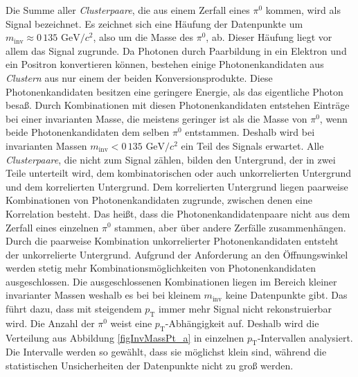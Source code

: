 Die Summe aller \textit{Clusterpaare}, die aus einem Zerfall eines $\pi^{0}$ kommen, wird als Signal bezeichnet.
Es zeichnet sich eine Häufung der Datenpunkte um $m_{\text{inv}}\approx 0\,135\text{ GeV}/c^{2}$, also um die Masse des $\pi^{0}$, ab.
Dieser Häufung liegt vor allem das Signal zugrunde.
Da Photonen durch Paarbildung in ein Elektron und ein Positron konvertieren können, bestehen einige Photonenkandidaten aus \textit{Clustern} aus nur einem der beiden Konversionsprodukte.
Diese Photonenkandidaten besitzen eine geringere Energie, als das eigentliche Photon besaß.
Durch Kombinationen mit diesen Photonenkandidaten entstehen Einträge bei einer invarianten Masse, die meistens geringer ist als die Masse von $\pi^{0}$, wenn beide Photonenkandidaten dem selben $\pi^{0}$ entstammen.
Deshalb wird bei invarianten Massen $m_\text{inv}<0\,135\text{ GeV}/c^{2}$ ein Teil des Signals erwartet.
\newline
Alle \textit{Clusterpaare}, die nicht zum Signal zählen, bilden den Untergrund, der in zwei Teile unterteilt wird, dem kombinatorischen oder auch unkorrelierten Untergrund und dem korrelierten Untergrund.
Dem korrelierten Untergrund liegen paarweise Kombinationen von Photonenkandidaten zugrunde, zwischen denen eine Korrelation besteht.
Das heißt, dass die Photonenkandidatenpaare nicht aus dem Zerfall eines einzelnen $\pi^{0}$ stammen, aber über andere Zerfälle zusammenhängen.
Durch die paarweise Kombination unkorrelierter Photonenkandidaten entsteht der unkorrelierte Untergrund.
\newline
Aufgrund der Anforderung an den Öffnungswinkel werden stetig mehr Kombinationsmöglichkeiten von Photonenkandidaten ausgeschlossen.
Die ausgeschlossenen Kombinationen liegen im Bereich kleiner invarianter Massen weshalb es bei bei kleinem $m_{\text{inv}}$ keine Datenpunkte gibt.
Das führt dazu, dass mit steigendem $p_{\text{T}}$ immer mehr Signal nicht rekonstruierbar wird.
\newline
Die Anzahl der $\pi^{0}$ weist eine $p_{\text{T}}$-Abhängigkeit auf.
Deshalb wird die Verteilung aus Abbildung \ref{figInvMassPt_a} in einzelnen $p_{\text{T}}$-Intervallen analysiert.
Die Intervalle werden so gewählt, dass sie möglichst klein sind, während die statistischen Unsicherheiten der Datenpunkte nicht zu groß werden.
